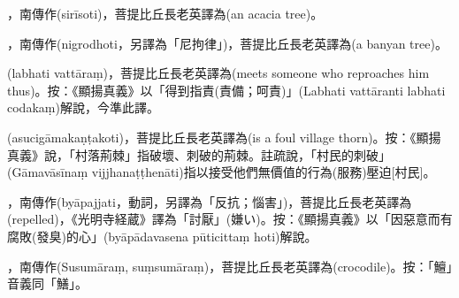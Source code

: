 \startitemgroup[noteitems]
\item{}，南傳作(sirīsoti)，菩提比丘長老英譯為(an acacia tree)。
\stopitemgroup

\startitemgroup[noteitems]
\item{}，南傳作(nigrodhoti，另譯為「尼拘律」)，菩提比丘長老英譯為(a banyan tree)。
\stopitemgroup

\startitemgroup[noteitems]
\item{}(labhati vattāraṃ)，菩提比丘長老英譯為(meets someone who reproaches him thus)。按：《顯揚真義》以「得到指責(責備；呵責)」(Labhati vattāranti labhati codakaṃ)解說，今準此譯。
\stopitemgroup

\startitemgroup[noteitems]
\item{}(asucigāmakaṇṭakoti)，菩提比丘長老英譯為(is a foul village thorn)。按：《顯揚真義》說，「村落荊棘」指破壞、刺破的荊棘。註疏說，「村民的刺破」(Gāmavāsīnaṃ vijjhanaṭṭhenāti)指以接受他們無價值的行為(服務)壓迫[村民]。
\stopitemgroup

\startitemgroup[noteitems]
\item{}，南傳作(byāpajjati，動詞，另譯為「反抗；惱害」)，菩提比丘長老英譯為(repelled)，《光明寺経蔵》譯為「討厭」(嫌い)。按：《顯揚真義》以「因惡意而有腐敗(發臭)的心」(byāpādavasena pūticittaṃ hoti)解說。
\stopitemgroup

\startitemgroup[noteitems]
\item{}，南傳作(Susumāraṃ, suṃsumāraṃ)，菩提比丘長老英譯為(crocodile)。按：「鱣」音義同「鱔」。
\stopitemgroup

